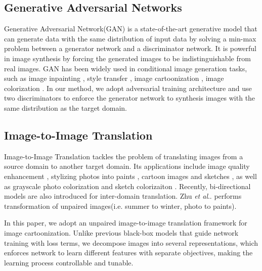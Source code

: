 \documentclass[10pt,twocolumn,letterpaper]{article}
\makeatletter
\DeclareRobustCommand\onedot{\futurelet\@let@token\@onedot}
\def\@onedot{\ifx\@let@token.\else.\null\fi\xspace}
\def\etal{\emph{et al}\onedot}
\makeatother
\begin{document}
\subsection{Generative Adversarial Networks}
\vspace{-0.3em}
Generative Adversarial Network(GAN) \cite{goodfellow2014generative} is a state-of-the-art generative model that can generate data with the same distribution of input data by solving a min-max problem between a generator network and a discriminator network. It is powerful in image synthesis by forcing the generated images to be indistinguishable from real images. GAN has been widely used in conditional image generation tasks, such as image inpainting \cite{pathak2016context}, style transfer \cite{sanakoyeu2018style}, image cartoonization \cite{chen2018cartoongan}, image colorization \cite{zhang2018two}. In our method, we adopt adversarial training architecture and use two discriminators to enforce the generator network to synthesis images with the same distribution as the target domain.
\vspace{-0.3em}
\subsection{Image-to-Image Translation}
\vspace{-0.3em}
Image-to-Image Translation \cite{isola2017image, huang2018multimodal, lee2018diverse, CycleGAN2017} tackles the problem of translating images from a source domain to another target domain. Its applications include image quality enhancement \cite{ignatov2018wespe}, stylizing photos into paints \cite{johnson2016perceptual, sanakoyeu2018style}, cartoon images \cite{chen2018cartoongan} and sketches \cite{li2019im2pencil}, as well as grayscale photo colorization \cite{zhang2016colorful} and sketch colorizaiton \cite{zhang2018two}. Recently,  bi-directional models are also introduced for inter-domain translation. Zhu \etal \cite{CycleGAN2017} performs transformation of unpaired images(i.e. summer to winter, photo to paints). 

In this paper, we adopt an unpaired image-to-image translation framework for image cartoonization. Unlike previous black-box models that guide network training with loss terms, we decompose images into several representations, which enforces network to learn different features with separate objectives, making the learning process controllable and tunable. 

\vspace{-0.3em}
\end{document}
